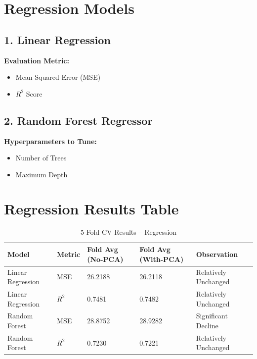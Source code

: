 \documentclass[11pt]{article}
\begin{document}
\section*{Regression Models}

\subsection*{1. Linear Regression}

\textbf{Evaluation Metric:}
\begin{itemize}
    \item Mean Squared Error (MSE)
    \item $R^2$ Score
\end{itemize}

\subsection*{2. Random Forest Regressor}

\textbf{Hyperparameters to Tune:}
\begin{itemize}
    \item Number of Trees
    \item Maximum Depth
\end{itemize}

\section*{Regression Results Table}

\begin{table}[H]
\centering
\caption{5-Fold CV Results – Regression}
\begin{tabularx}{\textwidth}{|X|X|X|X|X|}
\hline
\textbf{Model} & \textbf{Metric} & \textbf{Fold Avg (No-PCA)} & \textbf{Fold Avg (With-PCA)} & \textbf{Observation} \\
\hline
Linear Regression & MSE & 26.2188 & 26.2118 & Relatively Unchanged \\
Linear Regression & $R^2$ & 0.7481 & 0.7482 & Relatively Unchanged \\
Random Forest & MSE & 28.8752 & 28.9282 & Significant Decline \\
Random Forest & $R^2$ & 0.7230 & 0.7221 & Relatively Unchanged \\
\hline
\end{tabularx}
\end{table}
\end{document}

